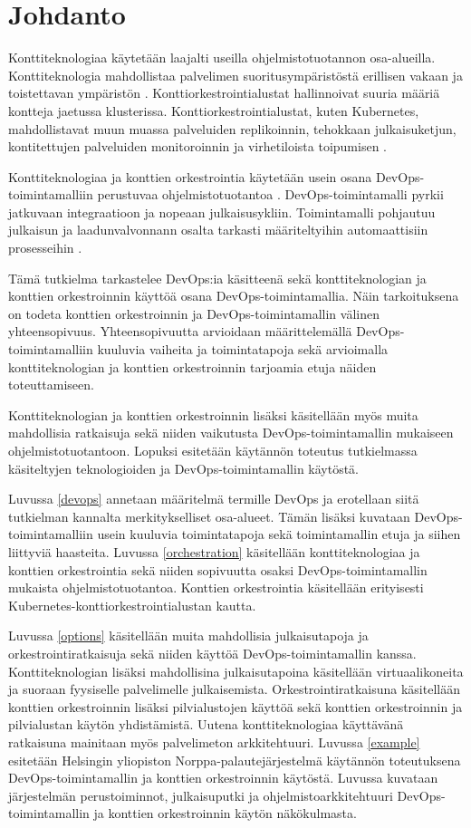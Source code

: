 \chapter{Johdanto\label{intro}}

Konttiteknologiaa käytetään laajalti useilla ohjelmistotuotannon osa-alueilla.
Konttiteknologia mahdollistaa palvelimen suoritusympäristöstä erillisen vakaan ja toistettavan ympäristön \cite{Watada19}.
Konttiorkestrointialustat hallinnoivat suuria määriä kontteja jaetussa klusterissa.
Konttiorkestrointialustat, kuten Kubernetes, mahdollistavat muun muassa palveluiden replikoinnin, tehokkaan julkaisuketjun, kontitettujen palveluiden monitoroinnin ja virhetiloista toipumisen \cite{Khan17}.

Konttiteknologiaa ja konttien orkestrointia käytetään usein osana DevOps-toimintamalliin perustuvaa ohjelmistotuotantoa \cite{Kang16, Narasimhulu23}.
DevOps-toimintamalli pyrkii jatkuvaan integraatioon ja nopeaan julkaisusykliin.
Toimintamalli pohjautuu julkaisun ja laadunvalvonnann osalta tarkasti määriteltyihin automaattisiin prosesseihin \cite{Jabbari16}.

Tämä tutkielma tarkastelee DevOps:ia käsitteenä sekä konttiteknologian ja konttien orkestroinnin käyttöä osana DevOps-toimintamallia.
Näin tarkoituksena on todeta konttien orkestroinnin ja DevOps-toimintamallin välinen yhteensopivuus.
Yhteensopivuutta arvioidaan määrittelemällä DevOps-toimintamalliin kuuluvia vaiheita ja toimintatapoja sekä arvioimalla konttiteknologian ja konttien orkestroinnin tarjoamia etuja näiden toteuttamiseen.

Konttiteknologian ja konttien orkestroinnin lisäksi käsitellään myös muita mahdollisia ratkaisuja sekä niiden vaikutusta DevOps-toimintamallin mukaiseen ohjelmistotuotantoon.
Lopuksi esitetään käytännön toteutus tutkielmassa käsiteltyjen teknologioiden ja DevOps-toimintamallin käytöstä.

Luvussa \ref{devops} annetaan määritelmä termille DevOps ja erotellaan siitä tutkielman kannalta merkitykselliset osa-alueet.
Tämän lisäksi kuvataan DevOps-toimintamalliin usein kuuluvia toimintatapoja sekä toimintamallin etuja ja siihen liittyviä haasteita.
Luvussa \ref{orchestration} käsitellään konttiteknologiaa ja konttien orkestrointia sekä niiden sopivuutta osaksi DevOps-toimintamallin mukaista ohjelmistotuotantoa.
Konttien orkestrointia käsitellään erityisesti Kubernetes-konttiorkestrointialustan kautta.

Luvussa \ref{options} käsitellään muita mahdollisia julkaisutapoja ja orkestrointiratkaisuja sekä niiden käyttöä DevOps-toimintamallin kanssa.
Konttiteknologian lisäksi mahdollisina julkaisutapoina käsitellään virtuaalikoneita ja suoraan fyysiselle palvelimelle julkaisemista.
Orkestrointiratkaisuna käsitellään konttien orkestroinnin lisäksi pilvialustojen käyttöä sekä konttien orkestroinnin ja pilvialustan käytön yhdistämistä.
Uutena konttiteknologiaa käyttävänä ratkaisuna mainitaan myös palvelimeton arkkitehtuuri.
Luvussa \ref{example} esitetään Helsingin yliopiston Norppa-palautejärjestelmä käytännön toteutuksena DevOps-toimintamallin ja konttien orkestroinnin käytöstä.
Luvussa kuvataan järjestelmän perustoiminnot, julkaisuputki ja ohjelmistoarkkitehtuuri DevOps-toimintamallin ja konttien orkestroinnin käytön näkökulmasta.
